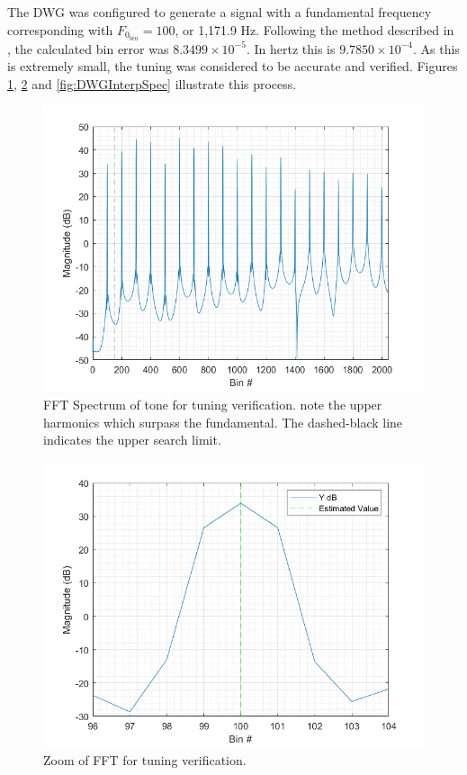 \documentclass[../main.tex]{subfiles}
\begin{document}
The DWG was configured to generate a signal with a fundamental frequency corresponding with $F_0_{bin} = 100$, or 1,171.9 Hz. Following the method described in , the calculated bin error was $8.3499 \times 10^{-5}$. In hertz this is $9.7850 \times 10^{-4}$. As this is extremely small, the tuning was considered to be accurate and verified. Figures \ref{fig:DWGInterpBins}, \ref{fig:DWGInterpBinsZoom} and \ref{fig:DWGInterpSpec} illustrate this process.

\begin{figure}[h]
    \centering
    \includegraphics[scale=.65]{./images/plots/StringDWGInterpBins.png}
    \caption{FFT Spectrum of tone for tuning verification. note the upper harmonics which surpass the fundamental. The dashed-black line indicates the upper search limit.}
    \label{fig:DWGInterpBins}
\end{figure}

\begin{figure}[h]
    \centering
    \includegraphics[scale=.65]{./images/plots/StringDWGInterpBinsZoom.png}
    \caption{Zoom of FFT for tuning verification.}
    \label{fig:DWGInterpBinsZoom}
\end{figure}
\end{document}
